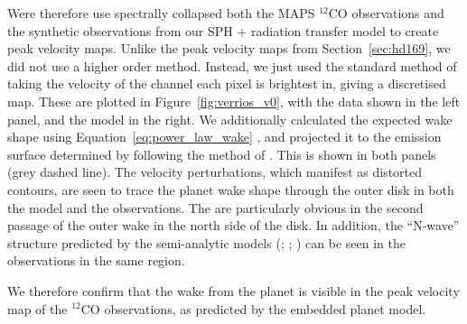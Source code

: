Were therefore use spectrally collapsed both the MAPS $^{12}$CO observations \citep{oberg2021} and the synthetic observations from our SPH + radiation transfer model to create peak velocity maps.
Unlike the peak velocity maps from Section~\ref{sec:hd169}, we did not use a higher order method.
Instead, we just used the standard method \citep[e.g.][]{casa2022} of taking the velocity of the channel each pixel is brightest in, giving a discretised map.
These are plotted in Figure~\ref{fig:verrios_v0}, with the data shown in the left panel, and the model in the right.
We additionally calculated the expected wake shape using Equation~\eqref{eq:power_law_wake} \citep{ogilvie2002,rafikov2002a}, and projected it to the emission surface determined by \citet{law2021a} following the method of \citet{calcino2022}.
This is shown in both panels (grey dashed line).
The velocity perturbations, which manifest as distorted contours, are seen to trace the planet wake shape through the outer disk in both the model and the observations.
The are particularly obvious in the second passage of the outer wake in the north side of the disk.
In addition, the ``N-wave'' structure predicted by the semi-analytic models (\citealt{goodman2001}; \citealt{rafikov2002a}; ) can be seen in the observations in the same region.

We therefore confirm that the wake from the planet is visible in the peak velocity map of the $^{12}$CO observations, as predicted by the embedded planet model.